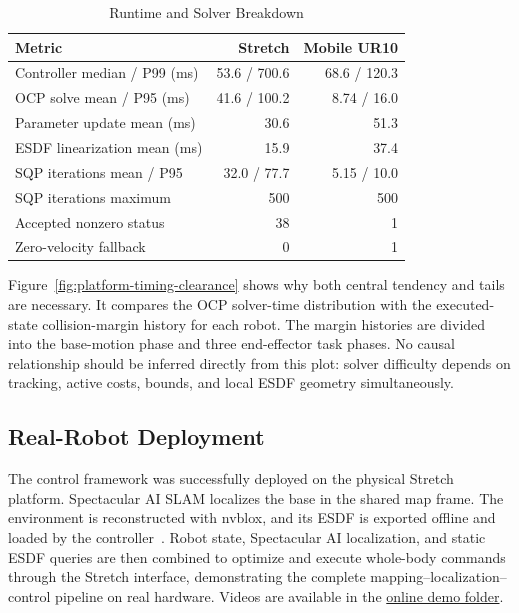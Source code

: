 \documentclass[conference]{IEEEtran}
\begin{document}
\begin{table}[t]
  \caption{Runtime and Solver Breakdown}
  \label{tab:runtime-breakdown}
  \centering
  \small
  \begin{tabular*}{\columnwidth}{@{\extracolsep{\fill}}lrr@{}}
    \toprule
    Metric & Stretch & Mobile UR10 \\
    \midrule
    Controller median / P99 (ms) & 53.6 / 700.6 & 68.6 / 120.3 \\
    OCP solve mean / P95 (ms) & 41.6 / 100.2 & 8.74 / 16.0 \\
    Parameter update mean (ms) & 30.6 & 51.3 \\
    ESDF linearization mean (ms) & 15.9 & 37.4 \\
    SQP iterations mean / P95 & 32.0 / 77.7 & 5.15 / 10.0 \\
    SQP iterations maximum & 500 & 500 \\
    Accepted nonzero status & 38 & 1 \\
    Zero-velocity fallback & 0 & 1 \\
    \bottomrule
  \end{tabular*}
\end{table}

Figure~\ref{fig:platform-timing-clearance} shows why both central tendency and
tails are necessary.  It compares the OCP solver-time distribution with the
executed-state collision-margin history for each robot.  The margin histories
are divided into the base-motion phase and three end-effector task phases.  No
causal relationship should be inferred directly from this plot: solver
difficulty depends on tracking, active costs, bounds, and local ESDF geometry
simultaneously.

\subsection{Real-Robot Deployment}

The control framework was successfully deployed on the physical Stretch
platform.  Spectacular AI SLAM localizes the base in the shared map frame.  The
environment is reconstructed with nvblox, and its ESDF is exported offline and
loaded by the controller~\cite{millane2023nvblox}.  Robot state, Spectacular AI
localization, and static ESDF queries are then combined to optimize and execute
whole-body commands through the Stretch interface, demonstrating the complete
mapping--localization--control pipeline on real hardware.  Videos are available
in the
\href{https://drive.google.com/drive/folders/1bsqAc2rYdHWyNgyATlZ9J\_RCnpOuP5xE?usp=drive\_link}{online demo folder}.
\end{document}
